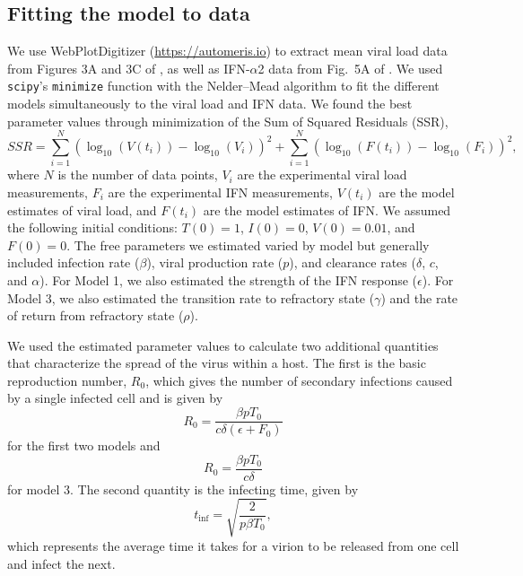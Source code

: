\documentclass[12pt]{article}
\newcommand{\tinf}{t_{\mathrm{inf}}}
\begin{document}
\subsection{Fitting the model to data}
\noindent
We use WebPlotDigitizer (\url{https://automeris.io}) to extract mean viral load data from Figures 3A and 3C of \cite{bauer24}, as well as IFN-$\alpha$2 data from Fig.\ 5A of \cite{bauer24}. We used \texttt{scipy}'s \texttt{minimize} function with the Nelder–Mead algorithm to fit the different models simultaneously to the viral load and IFN data. We found the best parameter values through minimization of the Sum of Squared Residuals (SSR),
\begin{equation*}
    SSR = \sum_{i=1}^{N} (\log_{10}(V(t_i)) - \log_{10}(V_i))^2 + \sum_{i=1}^{N} (\log_{10}(F(t_i)) - \log_{10}(F_i))^2,
\end{equation*}
where $N$ is the number of data points, $V_i$ are the experimental viral load measurements, $F_i$ are the experimental IFN measurements, $V(t_i)$ are the model estimates of viral load, and $F(t_i)$ are the model estimates of IFN. We assumed the following initial conditions: $T(0) = 1$, $I(0) = 0$, $V(0) = 0.01$, and $F(0) = 0$. The free parameters we estimated varied by model but generally included infection rate ($\beta$), viral production rate ($p$), and clearance rates ($\delta$, $c$, and $\alpha$). For Model 1, we also estimated the strength of the IFN response ($\epsilon$). For Model 3, we also estimated the transition rate to refractory state ($\gamma$) and the rate of return from refractory state ($\rho$).


We used the estimated parameter values to calculate two additional quantities that characterize the spread of the virus within a host. The first is the basic reproduction number, $R_0$, which gives the number of secondary infections caused by a single infected cell and is given by
\begin{equation*}
 R_0=\frac{\beta pT_0}{c\delta(\epsilon+F_0)}   
\end{equation*}
for the first two models and 
\begin{equation*}
 R_0=\frac{\beta pT_0}{c\delta}   
\end{equation*}
for model 3. The second quantity is the infecting time, given by
\begin{equation*}
    \tinf=\sqrt{\frac{2}{p\beta T_0}},
\end{equation*}
which represents the average time it takes for a virion to be released from one cell and infect the next.
\end{document}
